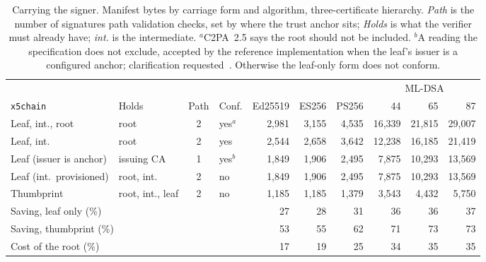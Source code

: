 \begin{table}[t]
\caption{Carrying the signer. Manifest bytes by carriage form and algorithm, three-certificate hierarchy. \emph{Path} is the number of signatures path validation checks, set by where the trust anchor sits; \emph{Holds} is what the verifier must already have; \emph{int.} is the intermediate. $^a$C2PA~2.5 says the root should not be included. $^b$A reading the specification does not exclude, accepted by the reference implementation when the leaf's issuer is a configured anchor; clarification requested~\cite{c2paspec142}. Otherwise the leaf-only form does not conform.}
\label{tab:carriage}
\footnotesize
\setlength{\tabcolsep}{3.5pt}
\begin{tabular}{llclrrrrrr}
\toprule
 & & & &  &  &  & \multicolumn{3}{c}{ML-DSA}\\\cmidrule(l){8-10}
\texttt{x5chain} & Holds & Path & Conf. & Ed25519 & ES256 & PS256 & 44 & 65 & 87\\
\midrule
Leaf, int., root & root & 2 & yes$^a$ & 2,981 & 3,155 & 4,535 & 16,339 & 21,815 & 29,007\\
Leaf, int. & root & 2 & yes & 2,544 & 2,658 & 3,642 & 12,238 & 16,185 & 21,419\\
Leaf (issuer is anchor) & issuing CA & 1 & yes$^b$ & 1,849 & 1,906 & 2,495 & 7,875 & 10,293 & 13,569\\
Leaf (int.\ provisioned) & root, int. & 2 & no & 1,849 & 1,906 & 2,495 & 7,875 & 10,293 & 13,569\\
Thumbprint & root, int., leaf & 2 & no & 1,185 & 1,185 & 1,379 & 3,543 & 4,432 & 5,750\\
\midrule
\multicolumn{4}{l}{Saving, leaf only (\%)} & 27 & 28 & 31 & 36 & 36 & 37\\
\multicolumn{4}{l}{Saving, thumbprint (\%)} & 53 & 55 & 62 & 71 & 73 & 73\\
\multicolumn{4}{l}{Cost of the root (\%)} & 17 & 19 & 25 & 34 & 35 & 35\\
\bottomrule
\end{tabular}
\end{table}
